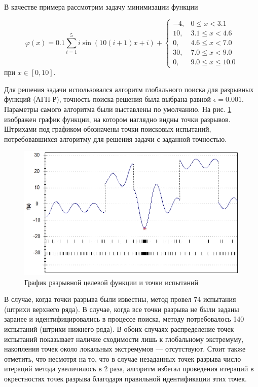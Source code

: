 \documentclass[11pt, oneside, a4paper]{article}
\begin{document}

В качестве примера рассмотрим задачу минимизации функции

\begin{equation}\label{test}
\varphi(x) = 0.1 \sum_{i=1}^5{i\sin(10(i+1)x+i)}+
\begin{cases}
	-4,  &0   \leq x < 3.1\\
	10,  &3.1 \leq x < 4.6\\
	 0,  &4.6 \leq x < 7.0\\
	30,  &7.0 \leq x < 9.0\\
	 0,  &9.0 \leq x \leq 10.0
\end{cases}
\end{equation}
при $x\in[0,10]$. 

Для решения задачи использовался алгоритм глобального поиска для разрывных функций (АГП-Р), точность поиска решения была выбрана равной $\epsilon = 0.001$. Параметры самого алгоритма были выставлены по умолчанию. На рис. \ref{ris1} изображен график функции, на котором наглядно видны точки разрывов. Штрихами под графиком обозначены точки поисковых испытаний, потребовавшихся алгоритму для решения задачи с заданной точностью. 

\begin{figure}[!ht]
	\begin{center}
			\includegraphics[width=0.7\linewidth]{ris1_2.png}
			\caption{График разрывной целевой функции и точки испытаний} %
      \label{ris1}
	\end{center}
\end{figure}


В случае, когда точки разрыва были известны, метод провел 74 испытания (штрихи верхнего ряда). В случае, когда все точки разрыва не были заданы заранее и идентифицировались в процессе поиска, методу потребовалось 140 испытаний (штрихи нижнего ряда). В обоих случаях распределение точек испытаний показывает наличие сходимости лишь к глобальному экстремуму, накопления точек около локальных экстремумов --- отсутствуют. Стоит также отметить, что несмотря на то, что в случае незаданных точек разрыва число итераций метода увеличилось в 2 раза, алгоритм избегал проведения итераций в окрестностях точек разрыва благодаря правильной идентификации этих точек.
\end{document}
